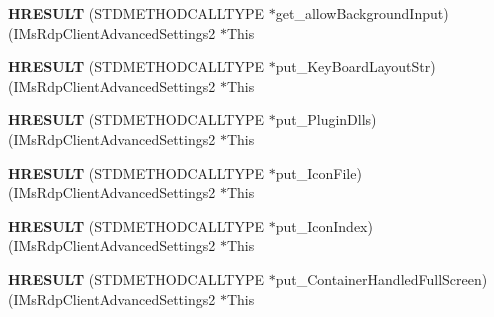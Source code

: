 \begin{DoxyCompactItemize}
\item 
\mbox{\label{struct_i_ms_rdp_client_advanced_settings2_vtbl_a2fac0b3cb9b6a5890997b5a63b46699d}} 
{\bfseries H\+R\+E\+S\+U\+LT} (S\+T\+D\+M\+E\+T\+H\+O\+D\+C\+A\+L\+L\+T\+Y\+PE $\ast$get\+\_\+allow\+Background\+Input)(I\+Ms\+Rdp\+Client\+Advanced\+Settings2 $\ast$This
\item 
\mbox{\label{struct_i_ms_rdp_client_advanced_settings2_vtbl_a16cfb2cc82f8b788aa42e463b0cd2542}} 
{\bfseries H\+R\+E\+S\+U\+LT} (S\+T\+D\+M\+E\+T\+H\+O\+D\+C\+A\+L\+L\+T\+Y\+PE $\ast$put\+\_\+\+Key\+Board\+Layout\+Str)(I\+Ms\+Rdp\+Client\+Advanced\+Settings2 $\ast$This
\item 
\mbox{\label{struct_i_ms_rdp_client_advanced_settings2_vtbl_ad1855b3159897c44a9df30ea3eb31762}} 
{\bfseries H\+R\+E\+S\+U\+LT} (S\+T\+D\+M\+E\+T\+H\+O\+D\+C\+A\+L\+L\+T\+Y\+PE $\ast$put\+\_\+\+Plugin\+Dlls)(I\+Ms\+Rdp\+Client\+Advanced\+Settings2 $\ast$This
\item 
\mbox{\label{struct_i_ms_rdp_client_advanced_settings2_vtbl_ac7e25aaaa211e4a345cd58857fafb951}} 
{\bfseries H\+R\+E\+S\+U\+LT} (S\+T\+D\+M\+E\+T\+H\+O\+D\+C\+A\+L\+L\+T\+Y\+PE $\ast$put\+\_\+\+Icon\+File)(I\+Ms\+Rdp\+Client\+Advanced\+Settings2 $\ast$This
\item 
\mbox{\label{struct_i_ms_rdp_client_advanced_settings2_vtbl_a8c3b158f280bb9a97017c4115a07f47e}} 
{\bfseries H\+R\+E\+S\+U\+LT} (S\+T\+D\+M\+E\+T\+H\+O\+D\+C\+A\+L\+L\+T\+Y\+PE $\ast$put\+\_\+\+Icon\+Index)(I\+Ms\+Rdp\+Client\+Advanced\+Settings2 $\ast$This
\item 
\mbox{\label{struct_i_ms_rdp_client_advanced_settings2_vtbl_a5073689f9057bb9b587e47c7f9a85615}} 
{\bfseries H\+R\+E\+S\+U\+LT} (S\+T\+D\+M\+E\+T\+H\+O\+D\+C\+A\+L\+L\+T\+Y\+PE $\ast$put\+\_\+\+Container\+Handled\+Full\+Screen)(I\+Ms\+Rdp\+Client\+Advanced\+Settings2 $\ast$This
\item 
\mbox{\label{struct_i_ms_rdp_client_advanced_settings2_vtbl_abc969a214458799238e4d38613ede81c}} 

\end{DoxyCompactItemize}
